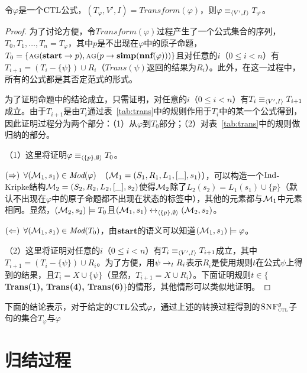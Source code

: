 \begin{proposition}
	令$\varphi$是一个$\textrm{CTL}$公式，$(T_{\varphi}, V', I) = Transform(\varphi)$，则$\varphi \equiv_{{\langle{V',I}\rangle}} T_{\varphi}$。
\end{proposition}
\begin{proof}
	为了讨论方便，令$Transform(\varphi)$过程产生了一个公式集合的序列，$T_0, T_1, \dots, T_n=T_{\varphi}$，其中$p$是不出现在$\varphi$中的原子命题，$T_0=\{\textsc{a} \textsc{g}(\textbf{start} \rightarrow p), \textsc{a} \textsc{g}(p \rightarrow \textbf{simp}(\textbf{nnf}(\varphi)))\}$且对任意的$i$（$0\leq i < n$）有$T_{i+1} = (T_i-\{\psi\}) \cup R_i$（$Trans(\psi)$返回的结果为$R_i$）。此外，在这一过程中，所有的公式都是其否定范式的形式。
	
	为了证明命题中的结论成立，只需证明，对任意的$i$（$0\leq i < n$）有$T_i \equiv_{{\langle{V',I}\rangle}} T_{i+1}$成立。由于$T_{i+1}$是由$T_i$通过表~\ref{tab:trans}中的规则作用于$T_i$中的某一个公式得到，因此证明过程分为两个部分：（1）从$\varphi$到$T_0$部分；（2）对表~\ref{tab:trans}中的规则做归纳的部分。
	
	（1）这里将证明$\varphi \equiv_{{\langle{\{p\},\emptyset}\rangle}} T_0$。
	
	$(\Rightarrow)$ $\forall ({\cal M}_1, s_1) \in \textit{Mod}(\varphi)$ （${\cal M}_1=(S_1,R_1,L_1,[\_],s_1)$），可以构造一个$\textrm{Ind}$-Kripke结构${\cal M}_2=(S_2,R_2,L_2,[\_],s_2)$使得${\cal M}_2$除了$L_2(s_2)=L_1(s_1) \cup \{p\}$（默认不出现在$\varphi$中的原子命题都不出现在状态的标签中），其他的元素都与${\cal M}_1$中元素相同。显然，$({\cal M}_2,s_2)\models T_0$且$({\cal M}_1,s_1) \leftrightarrow_{{\langle{\{p\}, \emptyset}\rangle}} ({\cal M}_2, s_2)$。
	
	$(\Leftarrow)$ $\forall ({\cal M}_1,s_1) \in \textit{Mod}(T_0)$，由$\textbf{start}$的语义可以知道$({\cal M}_1,s_1) \models \varphi$。
	
	（2）这里将证明对任意的$i$（$0\leq i < n$）有$T_i \equiv_{{\langle{V',I}\rangle}} T_{i+1}$成立，其中$T_{i+1} = (T_i-\{\psi\}) \cup R_i$。为了方便，用$\psi \rightarrow_t R_i$表示$R_i$是使用规则$t$在公式$\psi$上得到的结果，且$T_i=X\cup \{\psi\}$（显然，$T_{i+1}=X\cup R_i$）。下面证明规则$t\in \{$\textbf{Trans(1), Trans(4), Trans(6)}$\}$的情形，其他情形可以类似地证明。
	
	
	
\end{proof}

下面的结论表示，对于给定的$\textrm{CTL}$公式$\varphi$，通过上述的转换过程得到的${\textsc{SNF}_{\textsc{ctl}}^g}$子句的集合$T_{\varphi}$与$\varphi$





\section{归结过程}

